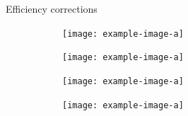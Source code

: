\documentclass{beamer}
\begin{document}
\begin{frame}{Efficiency corrections}
  \begin{figure}
    \centering
    \begin{subfigure}{0.38\textwidth}
      \centering
      \texttt{[image: example-image-a]}
    \end{subfigure}%
    \begin{subfigure}{0.38\textwidth}
      \centering
      \texttt{[image: example-image-a]}
    \end{subfigure}
    \begin{subfigure}{0.38\textwidth}
      \centering
      \texttt{[image: example-image-a]}
    \end{subfigure}%
    \begin{subfigure}{0.38\textwidth}
      \centering
      \texttt{[image: example-image-a]}
    \end{subfigure}
  \end{figure}
\end{frame}
\end{document}
